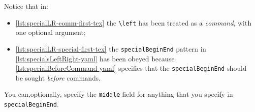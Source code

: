 \begin{example}
 Notice that in:
 \begin{itemize}
  \item \cref{lst:specialLR-comm-first-tex} the \lstinline!\left! has been treated as a
        \emph{command}, with one optional argument;
  \item \cref{lst:specialLR-special-first-tex} the \texttt{specialBeginEnd} pattern in
        \cref{lst:specialsLeftRight-yaml}
        has been obeyed because \cref{lst:specialBeforeCommand-yaml} specifies that the
        \texttt{specialBeginEnd} should be sought \emph{before} commands.
 \end{itemize}
 \end{example}

 You can,optionally, specify  the
 \texttt{middle} field for anything that you specify in \texttt{specialBeginEnd}.

